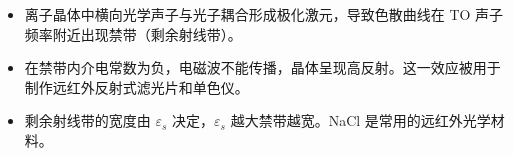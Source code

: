 \begin{insightbox}[物理图像]
\begin{itemize}
    \item 离子晶体中横向光学声子与光子耦合形成极化激元，导致色散曲线在 TO 声子频率附近出现禁带（剩余射线带）。
    \item 在禁带内介电常数为负，电磁波不能传播，晶体呈现高反射。这一效应被用于制作远红外反射式滤光片和单色仪。
    \item 剩余射线带的宽度由 $\varepsilon_s$ 决定，$\varepsilon_s$ 越大禁带越宽。NaCl 是常用的远红外光学材料。
\end{itemize}
\end{insightbox}
